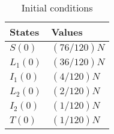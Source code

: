 \begin{table}
	\centering
	\begin{tabular}{ll}
		\toprule
			\textbf{States} & \textbf{Values}
            \\
        \midrule
            $S(0)$ & $(76/120)N$
            \\
        	$L_1(0)$ & $(36/120)N$
			\\
            $I_1(0)$ & $(4/120)N$
       		\\
     	    $L_2(0)$ & $(2/120)N$
			\\
     	    $I_2(0)$ & $(1/120)N$
     	    \\
     	    $T(0)$ & $(1/120)N$
     	    \\
		\bottomrule
    \end{tabular}
	\caption{Initial conditions}
\end{table}